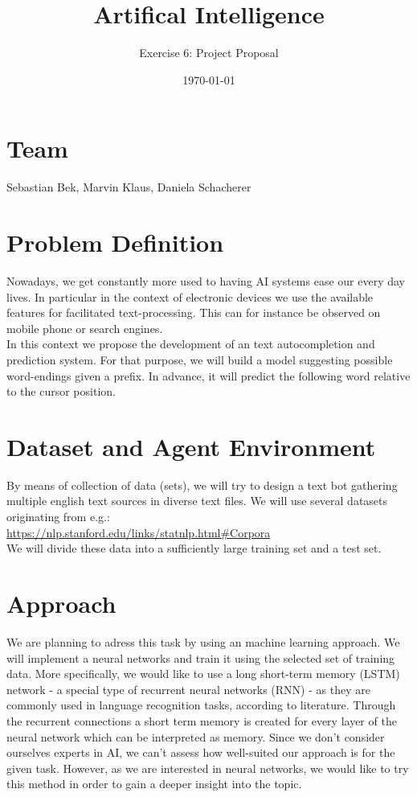 \documentclass[a4paper,11pt]{scrartcl}
\title{\vspace{-1cm}Artifical Intelligence}
\subtitle{Exercise 6: Project Proposal} \date{\today}
\begin{document}
\maketitle

\section*{Team}
Sebastian Bek, Marvin Klaus, Daniela Schacherer
\section*{Problem Definition}

Nowadays, we get constantly more used to having AI systems ease our every day lives. In particular in the context of electronic devices we use the available features for facilitated text-processing. This can for instance be observed on mobile phone or search engines. \\
In this context we propose the development of an text autocompletion and prediction system. For that purpose, we will build a model suggesting possible word-endings given a prefix. In advance, it will predict the following word relative to the cursor position.

\section*{Dataset and Agent Environment}

By means of collection of data (sets), we will try to design a text bot gathering multiple english text sources in diverse text files. We will use several datasets originating from e.g.:\\
\url{https://nlp.stanford.edu/links/statnlp.html#Corpora}\\
We will divide these data into a sufficiently large training set and a test set. 

\section*{Approach}

We are planning to adress this task by using an machine learning approach. We will implement a neural networks and train it using the selected set of training data. More specifically, we would like to use a long short-term memory (LSTM) network - a special type of recurrent neural networks (RNN) - as they are commonly used in language recognition tasks, according to literature. Through the recurrent connections a short term memory is created for every layer of the neural network which can be interpreted as memory.
Since we don't consider ourselves experts in AI, we can't assess how well-suited our approach is for the given task. However, as we are interested in neural networks, we would like to try this method in order to gain a deeper insight into the topic.\\
\end{document}
